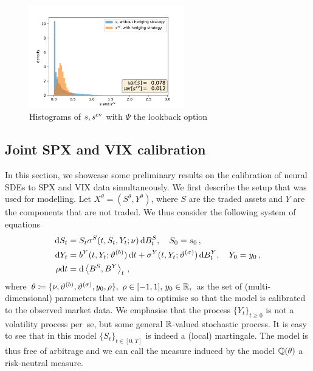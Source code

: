 \begin{figure}[H]\label{fig hedge error}
\centering
\includegraphics[clip,width=0.6\textwidth]{content/reschap1/Figures/figures_SPX/eval_hedging.pdf}
\caption{Histograms of $s, s^{\textup{cv}}$ with $\Psi$ the lookback option}	
\label{fig: SPX eval hedging strategy}

\end{figure}

\subsection{Joint SPX and VIX calibration}
In this section, we showcase some preliminary results on the calibration of neural SDEs to SPX and VIX data simultaneously. We first describe the setup that was used for modelling. Let $X^\theta=(S^\theta, Y^\theta)$, where $S$ are the traded assets and $Y$ are the components that are not traded. We thus consider the following system of equations
\begin{equation}\label{eq:nsdeSY}
\begin{split}
\mathrm{d} S_t & = S_t \sigma^S(t, S_t, Y_t;\nu)\,\mathrm{d} B^S_t, \quad S_0 = s_0 \,,\\
\mathrm{d} Y_t & = b^Y(t, Y_t; \vartheta^{(b)}) \, \mathrm{d} t +  \sigma^Y(t, Y_t; \vartheta^{(\sigma)})\,\mathrm{d} B^Y_t, \quad Y_0 = y_0\,,\\
\rho \mathrm{d} t &= \mathrm{d} \left\langle B^S, B^ Y\right\rangle_t \,,
\end{split}
\end{equation}
where
$\theta \coloneqq  \{\nu, \vartheta^{(b)}, \vartheta^{(\sigma)}, y_0, \rho \},\,\,\rho\in[-1,1],\,y_0\in\mathbb{R}, 
$
as the set of (multi-dimensional) parameters that we aim to optimise so that 
the model is calibrated to the observed market data. We emphasise that the process $\{Y_t\}_{t\geq 0}$ is not a volatility process per~se, but some general $\mathbb{R}$-valued stochastic process. It is easy to see that in this model $\{S_t\}_{t\in[0,T]}$ is indeed a (local) martingale. The model is thus free of arbitrage and we can call the measure induced by the model $\mathbb{Q}(\theta)$ a risk-neutral measure.

